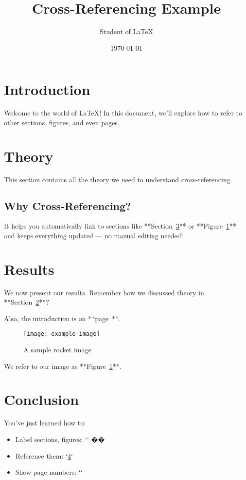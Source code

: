 \documentclass{article}
\title{Cross-Referencing Example}
\author{Student of LaTeX}
\date{\today}
\begin{document}
\maketitle
\tableofcontents
\newpage

\section{Introduction}
\label{sec:intro}
Welcome to the world of \LaTeX! In this document, we’ll explore how to refer to other sections, figures, and even pages.

\section{Theory}
\label{sec:theory}
This section contains all the theory we need to understand cross-referencing.

\subsection{Why Cross-Referencing?}
It helps you automatically link to sections like **Section~\ref{sec:results}** or **Figure~\ref{fig:rocket}** and keeps everything updated — no manual editing needed!

\section{Results}
\label{sec:results}
We now present our results. Remember how we discussed theory in **Section~\ref{sec:theory}**?

Also, the introduction is on **page~\pageref{sec:intro}**.

\begin{figure}[h]
    \centering
    \texttt{[image: example-image]} %
    \caption{A sample rocket image}
    \label{fig:rocket}
\end{figure}

We refer to our image as **Figure~\ref{fig:rocket}**.

\section{Conclusion}
You’ve just learned how to:
\begin{itemize}
    \item Label sections, figures: `\label{}` ��
    \item Reference them: `\ref{}`
    \item Show page numbers: `\pageref{}` 
\end{itemize}
\end{document}
